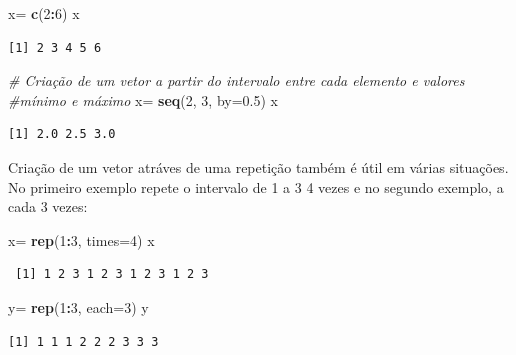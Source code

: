 \documentclass[12pt,brazil,oneside]{book}
\newenvironment{Shaded}{\begin{snugshade}}{\end{snugshade}}
\newcommand{\CommentTok}[1]{\textcolor[rgb]{0.56,0.35,0.01}{\textit{#1}}}
\newcommand{\DataTypeTok}[1]{\textcolor[rgb]{0.13,0.29,0.53}{#1}}
\newcommand{\DecValTok}[1]{\textcolor[rgb]{0.00,0.00,0.81}{#1}}
\newcommand{\FloatTok}[1]{\textcolor[rgb]{0.00,0.00,0.81}{#1}}
\newcommand{\KeywordTok}[1]{\textcolor[rgb]{0.13,0.29,0.53}{\textbf{#1}}}
\newcommand{\NormalTok}[1]{#1}
\newcommand{\OperatorTok}[1]{\textcolor[rgb]{0.81,0.36,0.00}{\textbf{#1}}}
\newcommand{\StringTok}[1]{\textcolor[rgb]{0.31,0.60,0.02}{#1}}
\begin{document}
\begin{Shaded}
\begin{Highlighting}[]
\NormalTok{x=}\StringTok{ }\KeywordTok{c}\NormalTok{(}\DecValTok{2}\OperatorTok{:}\DecValTok{6}\NormalTok{)}
\NormalTok{x}
\end{Highlighting}
\end{Shaded}

\begin{verbatim}
[1] 2 3 4 5 6
\end{verbatim}

\begin{Shaded}
\begin{Highlighting}[]
\CommentTok{# Criação de um vetor a partir do intervalo entre cada elemento e valores}
\CommentTok{#mínimo e máximo}
\NormalTok{x=}\StringTok{ }\KeywordTok{seq}\NormalTok{(}\DecValTok{2}\NormalTok{, }\DecValTok{3}\NormalTok{, }\DataTypeTok{by=}\FloatTok{0.5}\NormalTok{)}
\NormalTok{x}
\end{Highlighting}
\end{Shaded}

\begin{verbatim}
[1] 2.0 2.5 3.0
\end{verbatim}

Criação de um vetor atráves de uma repetição também é útil em várias
situações. No primeiro exemplo repete o intervalo de 1 a 3 4 vezes e no
segundo exemplo, a cada 3 vezes:

\begin{Shaded}
\begin{Highlighting}[]
\NormalTok{x=}\StringTok{ }\KeywordTok{rep}\NormalTok{(}\DecValTok{1}\OperatorTok{:}\DecValTok{3}\NormalTok{, }\DataTypeTok{times=}\DecValTok{4}\NormalTok{)}
\NormalTok{x}
\end{Highlighting}
\end{Shaded}

\begin{verbatim}
 [1] 1 2 3 1 2 3 1 2 3 1 2 3
\end{verbatim}

\begin{Shaded}
\begin{Highlighting}[]
\NormalTok{y=}\StringTok{ }\KeywordTok{rep}\NormalTok{(}\DecValTok{1}\OperatorTok{:}\DecValTok{3}\NormalTok{, }\DataTypeTok{each=}\DecValTok{3}\NormalTok{)}
\NormalTok{y}
\end{Highlighting}
\end{Shaded}

\begin{verbatim}
[1] 1 1 1 2 2 2 3 3 3
\end{verbatim}
\end{document}
